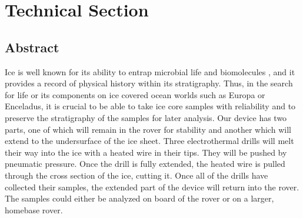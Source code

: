 \documentclass{article}
\begin{document}
\begin{titlepage}
\tableofcontents
\end{titlepage}

\section{Technical Section}
\subsection{Abstract}
Ice is well known for its ability to entrap microbial life and biomolecules \cite{Knowlton}, and it provides a record of physical history within its stratigraphy. Thus, in the search for life or its components on ice covered ocean worlds such as Europa or Enceladus, it is crucial to be able to take ice core samples with reliability and to preserve the stratigraphy of the samples for later analysis. Our device has two parts, one of which will remain in the rover for stability and another which will extend to the undersurface of the ice sheet. Three electrothermal drills will melt their way into the ice with a heated wire in their tips. They will be pushed by pneumatic pressure. Once the drill is fully extended, the heated wire is pulled through the cross section of the ice, cutting it. Once all of the drills have collected their samples, the extended part of the device will return into the rover. The samples could either be analyzed on board of the rover or on a larger, homebase rover.
\end{document}
